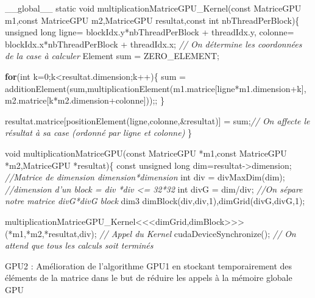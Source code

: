 \documentclass[]{article}
\newenvironment{Shaded}{\begin{snugshade}}{\end{snugshade}}
\newcommand{\KeywordTok}[1]{\textcolor[rgb]{0.13,0.29,0.53}{\textbf{{#1}}}}
\newcommand{\DataTypeTok}[1]{\textcolor[rgb]{0.13,0.29,0.53}{{#1}}}
\newcommand{\DecValTok}[1]{\textcolor[rgb]{0.00,0.00,0.81}{{#1}}}
\newcommand{\CommentTok}[1]{\textcolor[rgb]{0.56,0.35,0.01}{\textit{{#1}}}}
\newcommand{\NormalTok}[1]{{#1}}
\begin{document}
\begin{Shaded}
\begin{Highlighting}[]
\NormalTok{__global__ }\DataTypeTok{static} \DataTypeTok{void} \NormalTok{multiplicationMatriceGPU_Kernel(}\DataTypeTok{const} \NormalTok{MatriceGPU m1,}\DataTypeTok{const} \NormalTok{MatriceGPU m2,MatriceGPU resultat,}\DataTypeTok{const} \DataTypeTok{int} \NormalTok{nbThreadPerBlock)\{}
    \DataTypeTok{unsigned} \DataTypeTok{long} \NormalTok{ligne= blockIdx.y*nbThreadPerBlock + threadIdx.y, colonne= blockIdx.x*nbThreadPerBlock + threadIdx.x; }\CommentTok{// On détermine les coordonnées de la case à calculer}
    \NormalTok{Element sum = ZERO_ELEMENT;}
    
    \KeywordTok{for}\NormalTok{(}\DataTypeTok{int} \NormalTok{k=}\DecValTok{0}\NormalTok{;k<resultat.dimension;k++)\{}
        \NormalTok{sum = additionElement(sum,multiplicationElement(m1.matrice[ligne*m1.dimension+k],m2.matrice[k*m2.dimension+colonne]));;}
    \NormalTok{\}}
    
    \NormalTok{resultat.matrice[positionElement(ligne,colonne,&resultat)] = sum;}\CommentTok{// On affecte le résultat à sa case (ordonné par ligne et colonne)}
\NormalTok{\}}

\DataTypeTok{void} \NormalTok{multiplicationMatriceGPU(}\DataTypeTok{const} \NormalTok{MatriceGPU *m1,}\DataTypeTok{const} \NormalTok{MatriceGPU *m2,MatriceGPU *resultat)\{}
    \DataTypeTok{const} \DataTypeTok{unsigned} \DataTypeTok{long} \NormalTok{dim=resultat->dimension; }\CommentTok{//Matrice de dimension dimension*dimension}
    \DataTypeTok{int} \NormalTok{div = divMaxDim(dim); }\CommentTok{//dimension d'un block = div *div <= 32*32}
    \DataTypeTok{int} \NormalTok{divG = dim/div; }\CommentTok{//On sépare notre matrice  divG*divG block}
    \NormalTok{dim3 dimBlock(div,div,}\DecValTok{1}\NormalTok{),dimGrid(divG,divG,}\DecValTok{1}\NormalTok{);}
    
    \NormalTok{multiplicationMatriceGPU_Kernel<<<dimGrid,dimBlock>>>(*m1,*m2,*resultat,div); }\CommentTok{// Appel du Kernel}
    \NormalTok{cudaDeviceSynchronize(); }\CommentTok{// On attend que tous les calculs soit terminés}
\end{Highlighting}
\end{Shaded}

GPU2 : Amélioration de l'algorithme GPU1 en stockant temporairement des
éléments de la matrice dans le but de réduire les appels à la mémoire
globale GPU
\end{document}
